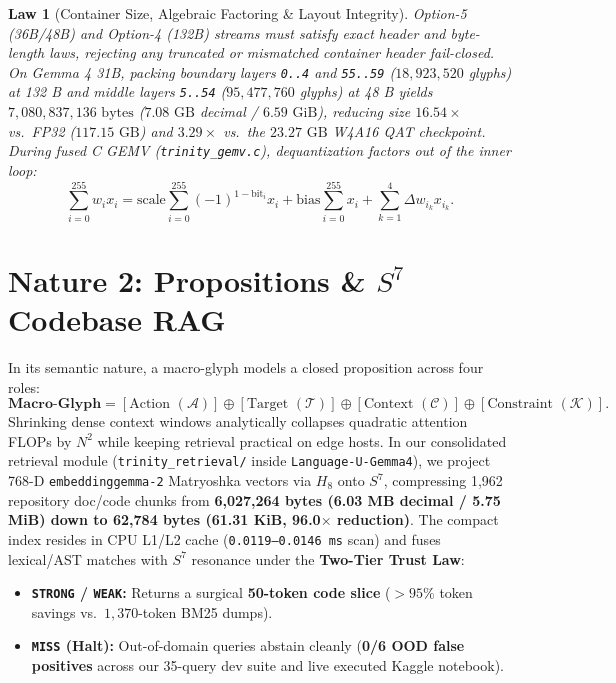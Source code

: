 \documentclass[10pt,twocolumn,letterpaper]{article}
\newtheorem{law}{Law}
\begin{document}
\begin{law}[Container Size, Algebraic Factoring \& Layout Integrity]
Option-5 (36B/48B) and Option-4 (132B) streams must satisfy exact header and byte-length laws, rejecting any truncated or mismatched container header fail-closed. On Gemma 4 31B, packing boundary layers \texttt{0..4} and \texttt{55..59} ($18,923,520$ glyphs) at 132 B and middle layers \texttt{5..54} ($95,477,760$ glyphs) at 48 B yields $7,080,837,136\text{ bytes}$ ($7.08\text{ GB}$ decimal / $6.59\text{ GiB}$), reducing size $16.54\times$ vs.\ FP32 ($117.15\text{ GB}$) and $3.29\times$ vs.\ the $23.27\text{ GB}$ W4A16 QAT checkpoint. During fused C GEMV (\texttt{trinity\_gemv.c}), dequantization factors out of the inner loop:
\begin{equation}
\sum_{i=0}^{255} w_i x_i = \text{scale} \sum_{i=0}^{255} (-1)^{1-\text{bit}_i} x_i + \text{bias} \sum_{i=0}^{255} x_i + \sum_{k=1}^{4} \Delta w_{i_k} x_{i_k}.
\end{equation}
\end{law}

\section{Nature 2: Propositions \& $S^7$ Codebase RAG}

In its semantic nature, a macro-glyph models a closed proposition across four roles:
\begin{equation}
\mathbf{Macro\text{-}Glyph} = [\text{Action } (\mathcal{A})] \oplus [\text{Target } (\mathcal{T})] \oplus [\text{Context } (\mathcal{C})] \oplus [\text{Constraint } (\mathcal{K})].
\end{equation}
Shrinking dense context windows analytically collapses quadratic attention FLOPs by $N^2$ while keeping retrieval practical on edge hosts. In our consolidated retrieval module (\texttt{trinity\_retrieval/} inside \texttt{Language-U-Gemma4}), we project 768-D \texttt{embeddinggemma-2} Matryoshka vectors via $H_8$ onto $S^7$, compressing 1,962 repository doc/code chunks from \textbf{6,027,264 bytes (6.03 MB decimal / 5.75 MiB) down to 62,784 bytes (61.31 KiB, 96.0$\times$ reduction)}. The compact index resides in CPU L1/L2 cache (\texttt{0.0119--0.0146~ms} scan) and fuses lexical/AST matches with $S^7$ resonance under the \textbf{Two-Tier Trust Law}:
\begin{itemize}
  \item \textbf{\texttt{STRONG} / \texttt{WEAK}:} Returns a surgical \textbf{50-token code slice} ($>95\%$ token savings vs.\ $1,370$-token BM25 dumps).
  \item \textbf{\texttt{MISS} (Halt):} Out-of-domain queries abstain cleanly (\textbf{0/6 OOD false positives} across our 35-query dev suite and live executed Kaggle notebook).
\end{itemize}
\end{document}
